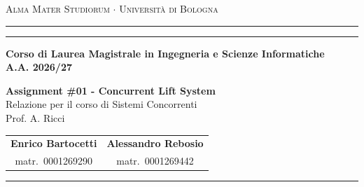 \hypersetup{pageanchor=false}
\begin{titlepage}
  \begin{center}
    {{\Large{\textsc{Alma Mater Studiorum $\cdot$ Università di Bologna}}}}\\[1ex]
    \rule[0.1cm]{15.8cm}{0.1mm}
    \rule[0.5cm]{15.8cm}{0.6mm}
    {\small{\bf Corso di Laurea Magistrale in Ingegneria e Scienze Informatiche \\ A.A. 2026/27 }}
  \end{center}

  \vfill
  \begin{center}
    {\LARGE\textbf{Assignment \#01 - Concurrent Lift System}}\\[2.5ex]
    {\LARGE Relazione per il corso di Sistemi Concorrenti}\\[2.5ex]
    {\LARGE Prof. A. Ricci}
  \end{center}
  \vfill

  \begin{center}
    \begin{tabular}{@{}c@{\qquad}c@{}}
      {\large\bf Enrico Bartocetti} & {\large\bf Alessandro Rebosio} \\[0.5ex]
      {\small matr.\ 0001269290 } & {\small matr.\ 0001269442}
    \end{tabular}
  \end{center}

  \vspace{2mm}
  \noindent\rule{\linewidth}{0.4pt}

\end{titlepage}
\hypersetup{pageanchor=true}
